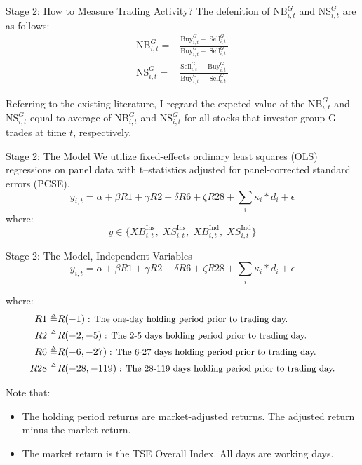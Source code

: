 \documentclass{beamer}
\begin{document}
\begin{frame}{Stage 2: How to Measure Trading Activity?}
    The defenition of \(\mathrm{NB}_{i, t}^G\) and \(\mathrm{NS}_{i, t}^G\) are as follows:
    \[
        \begin{aligned}
            \mathrm{NB}_{i, t}^G= & \frac{\mathrm{Buy}_{i, t}^G -\operatorname{Sell}_{i, t}^G}{\mathrm{Buy}_{i, t}^G +\operatorname{Sell}_{i, t}^G} \\
            \mathrm{NS}_{i, t}^G= & \frac{\mathrm{Sell}_{i, t}^G -\operatorname{Buy}_{i, t}^G}{\mathrm{Buy}_{i, t}^G +\operatorname{Sell}_{i, t}^G}
        \end{aligned}
    \]

    Referring to the existing literature, I regrard the expeted value of
    the \(\mathrm{NB}_{i, t}^G\) and \(\mathrm{NS}_{i, t}^G\) equal to
    average of \(\mathrm{NB}_{i, t}^G\) and \(\mathrm{NS}_{i, t}^G\) for
    all stocks that investor group \(\mathrm{G}\) trades at time \(t\), respectively.

\end{frame}


\begin{frame}{Stage 2: The Model}
    We utilize fixed-effects ordinary least squares (OLS) regressions on panel data with t–statistics adjusted for panel-corrected standard errors (PCSE).
    \[
        y_{i,t} = \alpha + \beta R1 + \gamma R2 + \delta R6 + \zeta R28 + \sum_i \kappa_i * d_i + \epsilon
    \]
    where:
    \[
        y \in \{XB_{i,t}^\mathrm{Ins}, \; XS_{i,t}^\mathrm{Ins}, \; XB_{i,t}^\mathrm{Ind}, \; XS_{i,t}^\mathrm{Ind}\}
    \]

\end{frame}


\begin{frame}{Stage 2: The Model, Independent Variables}
    \[
        y_{i,t} = \alpha + \beta R1 + \gamma R2 + \delta R6 + \zeta R28 + \sum_i \kappa_i * d_i + \epsilon
    \]

    where:
    \[
        \begin{aligned}
            R1 \triangleq  & R (-1) \; \text{\small{: The one-day holding period prior to trading day.}}
            \\
            R2 \triangleq  & R(-2, -5) \; \text{\small{: The 2-5 days holding period prior to trading day.}}
            \\
            R6 \triangleq  & R(-6, -27) \; \text{\small{: The 6-27 days holding period prior to trading day.}}
            \\
            R28 \triangleq & R(-28, -119) \; \text{\small{: The 28-119 days holding period prior to trading day.}}
        \end{aligned}
    \]

    Note that:
    \begin{itemize}
        \item The holding period returns are market-adjusted returns. The adjusted return minus the market return.
        \item The market return is the TSE Overall Index. All days are working days.
    \end{itemize}

\end{frame}
\end{document}
